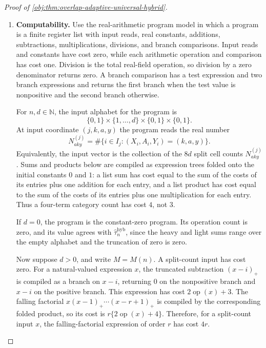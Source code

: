 \documentclass[11pt]{article}
\begin{document}
\begin{proof}[Proof of \cref{obj:thm:overlap-adaptive-universal-hybrid}]
\begin{enumerate}
\item \textbf{Computability.}
Use the real-arithmetic program model in which a program is a finite register list with input reads, real constants, additions, subtractions, multiplications, divisions, and branch comparisons.  Input reads and constants have cost zero, while each arithmetic operation and comparison has cost one.  Division is the total real-field operation, so division by a zero denominator returns zero.  A branch comparison has a test expression and two branch expressions and returns the first branch when the test value is nonpositive and the second branch otherwise.

For \(n,d\in\mathbb N\), the input alphabet for the program is
\[
\{0,1\}\times\{1,\ldots,d\}\times\{0,1\}\times\{0,1\}.
\]
At input coordinate \((j,k,a,y)\) the program reads the real number
\[
N^{(j)}_{aky}
=
\#\{i\in I_j:(X_i,A_i,Y_i)=(k,a,y)\}.
\]
Equivalently, the input vector is the collection of the \(8d\) split cell counts \(N^{(j)}_{aky}\).  Sums and products below are compiled as expression trees folded onto the initial constants \(0\) and \(1\): a list sum has cost equal to the sum of the costs of its entries plus one addition for each entry, and a list product has cost equal to the sum of the costs of its entries plus one multiplication for each entry.  Thus a four-term category count has cost \(4\), not \(3\).

If \(d=0\), the program is the constant-zero program.  Its operation count is zero, and its value agrees with \(\widehat\tau_n^{\mathrm{hyb}}\), since the heavy and light sums range over the empty alphabet and the truncation of zero is zero.

Now suppose \(d>0\), and write \(M=M(n)\).  A split-count input has cost zero.  For a natural-valued expression \(x\), the truncated subtraction \((x-i)_+\) is compiled as a branch on \(x-i\), returning \(0\) on the nonpositive branch and \(x-i\) on the positive branch.  This expression has cost \(2\operatorname{op}(x)+3\).  The falling factorial \(x(x-1)_+\cdots(x-r+1)_+\) is compiled by the corresponding folded product, so its cost is \(r\{2\operatorname{op}(x)+4\}\).  Therefore, for a split-count input \(x\), the falling-factorial expression of order \(r\) has cost \(4r\).


\end{enumerate}
\end{proof}
\end{document}
